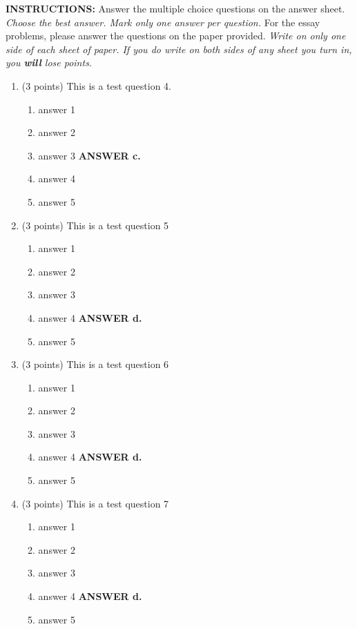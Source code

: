 \documentclass{article}
\newcommand{\ans}[1]{ \ifnum\showans=1 {\bf ANSWER #1.} \fi }
\begin{document}
{ \Large
\begin{center}
\end{center}
}

\vspace{.1in}

\noindent
{\Large\bf INSTRUCTIONS:} Answer the multiple choice questions on the
answer sheet.  {\em Choose the best answer.  Mark only one answer per
question.}  For the essay problems, please answer the questions on the
paper provided.  {\em Write on only one side of each sheet of paper.
If you do write on both sides of any sheet you turn in, you {\bf will}
lose points.}

\vspace{.1in}

\begin{enumerate}

\item (3 points) This is a test question 4. 
  \begin{enumerate}
  \item answer 1
  \item answer 2
  \item answer 3  \ans{c}
  \item answer 4
  \item answer 5
  \end{enumerate}

\item (3 points) This is a test question 5
  \begin{enumerate}
  \item answer 1
  \item answer 2
  \item answer 3
  \item answer 4  \ans{d}
  \item answer 5
  \end{enumerate}

\item (3 points) This is a test question 6
  \begin{enumerate}
  \item answer 1
  \item answer 2
  \item answer 3
  \item answer 4  \ans{d}
  \item answer 5
  \end{enumerate}

\item (3 points) This is a test question 7
  \begin{enumerate}
  \item answer 1
  \item answer 2
  \item answer 3
  \item answer 4  \ans{d}
  \item answer 5
  \end{enumerate}


\end{enumerate}
\end{document}

